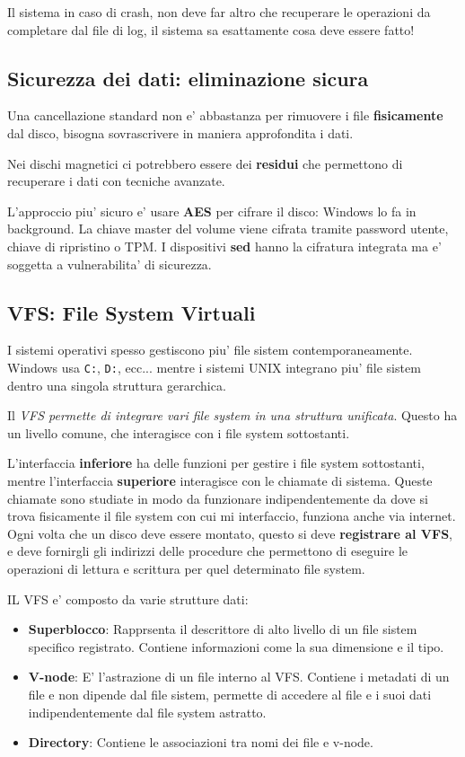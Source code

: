 Il sistema in caso di crash, non deve far altro che recuperare le operazioni da completare dal file di log,
il sistema sa esattamente cosa deve essere fatto!

\subsection{Sicurezza dei dati: eliminazione sicura}
Una cancellazione standard non e' abbastanza per rimuovere i file \textbf{fisicamente} dal disco, bisogna
sovrascrivere in maniera approfondita i dati.

Nei dischi magnetici ci potrebbero essere dei \textbf{residui} che permettono di recuperare i dati con tecniche avanzate.

L'approccio piu' sicuro e' usare \textbf{AES} per cifrare il disco: Windows lo fa in background. La chiave
master del volume viene cifrata tramite password utente, chiave di ripristino o TPM.
I dispositivi \textbf{sed} hanno la cifratura integrata ma e' soggetta a vulnerabilita' di sicurezza.

\subsection{VFS: File System Virtuali}
I sistemi operativi spesso gestiscono piu' file sistem contemporaneamente. Windows usa \texttt{C:}, \texttt{D:}, ecc...
mentre i sistemi UNIX integrano piu' file sistem dentro una singola struttura gerarchica.

Il \textit{VFS permette di integrare vari file system in una struttura unificata}. Questo ha un livello comune, che interagisce con i 
file system sottostanti.

L'interfaccia \textbf{inferiore} ha delle funzioni per gestire i file system sottostanti, mentre l'interfaccia \textbf{superiore}
interagisce con le chiamate di sistema. Queste chiamate sono studiate in modo da funzionare indipendentemente da dove 
si trova fisicamente il file system con cui mi interfaccio, funziona anche via internet. \\

Ogni volta che un disco deve essere montato, questo si deve \textbf{registrare al VFS}, e deve fornirgli gli indirizzi
delle procedure che permettono di eseguire le operazioni di lettura e scrittura per quel determinato file system.

IL VFS e' composto da varie strutture dati:
\begin{itemize}
    \item \textbf{Superblocco}: Rapprsenta il descrittore di alto livello di un file sistem specifico registrato.
    Contiene informazioni come la sua dimensione e il tipo.
    \item \textbf{V-node}: E' l'astrazione di un file interno al VFS. Contiene i metadati di un file e non dipende dal file sistem, permette 
    di accedere al file e i suoi dati indipendentemente dal file system astratto.
    \item \textbf{Directory}: Contiene le associazioni tra nomi dei file e v-node.
\end{itemize}

